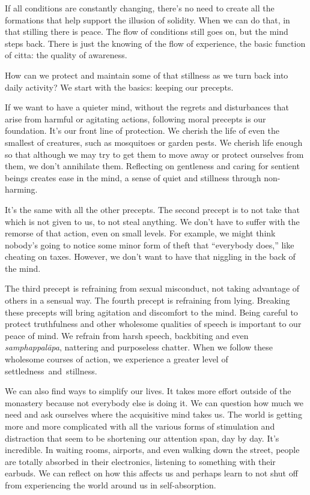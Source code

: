 If all conditions are constantly changing, there's no need to create all the formations that help support the illusion of solidity. When we can do that, in that stilling there is peace. The flow of conditions still goes on, but the mind steps back. There is just the knowing of the flow of experience, the basic function of citta: the quality of awareness.

How can we protect and maintain some of that stillness as we turn back into daily activity? We start with the basics: keeping our precepts.

If we want to have a quieter mind, without the regrets and disturbances that arise from harmful or agitating actions, following moral precepts is our foundation. It's our front line of protection. We cherish the life of even the smallest of creatures, such as mosquitoes or garden pests. We cherish life enough so that although we may try to get them to move away or protect ourselves from them, we don't annihilate them. Reflecting on gentleness and caring for sentient beings creates ease in the mind, a sense of quiet and stillness through non-harming.

It's the same with all the other precepts. The second precept is to not take that which is not given to us, to not steal anything. We don't have to suffer with the remorse of that action, even on small levels. For example, we might think nobody's going to notice some minor form of theft that ``everybody does,'' like cheating on taxes. However, we don't want to have that niggling in the back of the mind.

The third precept is refraining from sexual misconduct, not taking advantage of others in a sensual way. The fourth precept is refraining from lying. Breaking these precepts will bring agitation and discomfort to the mind. Being careful to protect truthfulness and other wholesome qualities of speech is important to our peace of mind. We refrain from harsh speech, backbiting and even \emph{samphappalāpa}, nattering and purposeless chatter. When we follow these wholesome courses of action, we experience a greater level of \mbox{settledness and stillness.}

We can also find ways to simplify our lives. It takes more effort outside of the monastery because not everybody else is doing it. We can question how much we need and ask ourselves where the acquisitive mind takes us. The world is getting more and more complicated with all the various forms of stimulation and distraction that seem to be shortening our attention span, day by day. It's incredible. In waiting rooms, airports, and even walking down the street, people are totally absorbed in their electronics, listening to something with their earbuds. We can reflect on how this affects us and perhaps learn to not shut off from experiencing the world around us in self-absorption.

